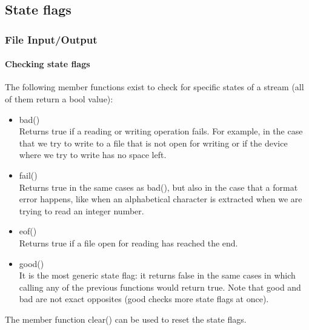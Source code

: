 \documentclass[hyperref={pdfpagelabels=true}]{beamer}
\begin{document}
\subsection{State flags}

\begin{frame}
\frametitle{File Input/Output}
\framesubtitle{Checking state flags}
\scriptsize
The following member functions exist to check for specific states of a stream (all of them return a bool value): 
\begin{itemize}[<+->]
\item \alert{bad()}\\
Returns true if a reading or writing operation fails. For example, in the case that we try to write to a file that is not open for writing or if the device where we try to write has no space left.
 \item \alert{fail()}\\
Returns true in the same cases as bad(), but also in the case that a format error happens, like when an alphabetical character is extracted when we are trying to read an integer number.
\item \alert{eof()}\\
Returns true if a file open for reading has reached the end.
\item \alert{good()}\\
It is the most generic state flag: it returns false in the same cases in which calling any of the previous functions would return true. Note that good and bad are not exact opposites (good checks more state flags at once).
\end{itemize}
The member function \alert{clear()} can be used to reset the state flags.
\end{frame}
\end{document}
